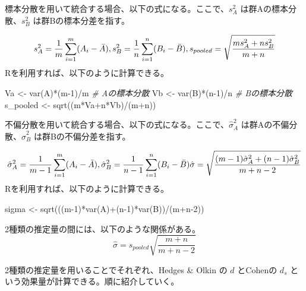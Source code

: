 \documentclass[
  ja=standard, xelatex, base=12pt]{bxjsreport}
\newenvironment{Shaded}{\begin{snugshade}}{\end{snugshade}}
\newcommand{\CommentTok}[1]{\textcolor[rgb]{0.56,0.35,0.01}{\textit{#1}}}
\newcommand{\DecValTok}[1]{\textcolor[rgb]{0.00,0.00,0.81}{#1}}
\newcommand{\FunctionTok}[1]{\textcolor[rgb]{0.00,0.00,0.00}{#1}}
\newcommand{\NormalTok}[1]{#1}
\newcommand{\OtherTok}[1]{\textcolor[rgb]{0.56,0.35,0.01}{#1}}
\newcommand{\SpecialCharTok}[1]{\textcolor[rgb]{0.00,0.00,0.00}{#1}}
\begin{document}
標本分散を用いて統合する場合、以下の式になる。ここで、\(s_A^2\) は群Aの標本分散、\(s_B^2\) は群Bの標本分差を指す。

\[
s_A^2=\frac{1}{m}\sum_{i=1}^{m}(A_i-\bar{A}), s_B^2=\frac{1}{n}\sum_{i=1}^{n}(B_i-\bar{B}), \\
s_{pooled}=\sqrt\frac{ms_A^2+ns_B^2}{m+n}
\] Rを利用すれば、以下のように計算できる。

\begin{Shaded}
\begin{Highlighting}[]
\NormalTok{Va }\OtherTok{\textless{}{-}} \FunctionTok{var}\NormalTok{(A)}\SpecialCharTok{*}\NormalTok{(m}\DecValTok{{-}1}\NormalTok{)}\SpecialCharTok{/}\NormalTok{m  }\CommentTok{\# Aの標本分散}
\NormalTok{Vb }\OtherTok{\textless{}{-}} \FunctionTok{var}\NormalTok{(B)}\SpecialCharTok{*}\NormalTok{(n}\DecValTok{{-}1}\NormalTok{)}\SpecialCharTok{/}\NormalTok{n  }\CommentTok{\# Bの標本分散}
\NormalTok{s\_pooled }\OtherTok{\textless{}{-}} \FunctionTok{sqrt}\NormalTok{((m}\SpecialCharTok{*}\NormalTok{Va}\SpecialCharTok{+}\NormalTok{n}\SpecialCharTok{*}\NormalTok{Vb)}\SpecialCharTok{/}\NormalTok{(m}\SpecialCharTok{+}\NormalTok{n))}
\end{Highlighting}
\end{Shaded}

不偏分散を用いて統合する場合、以下の式になる。ここで、\(\hat\sigma_A^2\) は群Aの不偏分散、\(\hat\sigma_B^2\) は群Bの不偏分差を指す。

\[
\hat\sigma_A^2=\frac{1}{m-1}\sum_{i=1}^{m}(A_i-\bar{A}), \hat\sigma_B^2=\frac{1}{n-1}\sum_{i=1}^{n}(B_i-\bar{B}) \\
\hat\sigma=\sqrt\frac{(m-1)\hat\sigma_A^2+(n-1)\hat\sigma_B^2}{m+n-2}
\] Rを利用すれば、以下のように計算できる。

\begin{Shaded}
\begin{Highlighting}[]
\NormalTok{sigma }\OtherTok{\textless{}{-}} \FunctionTok{sqrt}\NormalTok{(((m}\DecValTok{{-}1}\NormalTok{)}\SpecialCharTok{*}\FunctionTok{var}\NormalTok{(A)}\SpecialCharTok{+}\NormalTok{(n}\DecValTok{{-}1}\NormalTok{)}\SpecialCharTok{*}\FunctionTok{var}\NormalTok{(B))}\SpecialCharTok{/}\NormalTok{(m}\SpecialCharTok{+}\NormalTok{n}\DecValTok{{-}2}\NormalTok{))}
\end{Highlighting}
\end{Shaded}

2種類の推定量の間には、以下のような関係がある。 \[
\hat\sigma=s_{pooled}\sqrt{\frac{m+n}{m+n-2}}
\]

2種類の推定量を用いることでそれぞれ、Hedges \& Olkin の \(d\) とCohenの \(d_s\) という効果量が計算できる。順に紹介していく。
\end{document}
